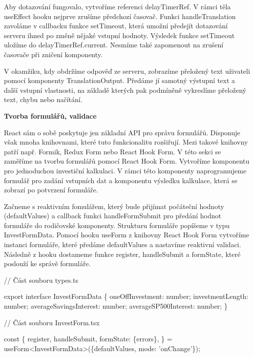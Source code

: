 Aby dotazování fungovalo, vytvoříme referenci delayTimerRef. V rámci těla useEffect hooku nejprve zrušíme předchozí časovač. 
Funkci handleTranslation zavoláme v callbacku funkce setTimeout, která umožní předejít dotazování serveru ihned po změně nějaké vstupní hodnoty. 
Výsledek funkce setTimeout uložíme do delayTimerRef.current. Nesmíme také zapomenout na zrušení časovače při zničení komponenty.

V okamžiku, kdy obdržíme odpověď ze serveru, zobrazíme přeložený text uživateli pomocí komponenty TranslationOutput. 
Předáme jí samotný výstupní text a další vstupní vlastnosti, na základě kterých pak podmíněně vykreslíme přeložený text, chybu nebo načítání.

\begin{flushleft}
  \textbf{Tvorba formulářů, validace}
\end{flushleft}

React sám o sobě poskytuje jen základní API pro správu formulářů. Disponuje však mnoha knihovnami, které tuto funkcionalitu rozšiřují. 
Mezi takové knihovny patří např. Formik, Redux Form nebo React Hook Form. V této sekci se zaměříme na tvorbu formulářů pomocí React Hook Form. 
Vytvoříme komponentu pro jednoduchou investiční kalkulaci. 
V rámci této komponenty naprogramujeme formulář pro zadání vstupních dat a komponentu výsledku kalkulace, která se zobrazí po potvrzení formuláře.

Začneme s reaktivním fomulářem, který bude přijímat počáteční hodnoty (defaultValues) a callback funkci handleFormSubmit pro předání hodnot formuláře do rodičovské komponenty. 
Strukturu formuláře popíšeme v typu InvestFormData. Pomocí hooku useForm z knihovny React Hook Form vytvoříme instanci formuláře, které předáme defaultValues a nastavíme reaktivní validaci. 
Následně z hooku dostameme funkce register, handleSubmit a formState, které poslouží ke správě formuláře.

\begin{prog}
// Část souboru types.ts

export interface InvestFormData \{
  oneOffInvestment: number;
  investmentLength: number;
  averageSavingsInterest: number;
  averageSP500Interest: number;
\}

// Část souboru InvestForm.tsx

const \{
  register,
  handleSubmit,
  formState: \{errors\},
\} = useForm<InvestFormData>(\{defaultValues, mode: 'onChange'\});
\end{prog}

